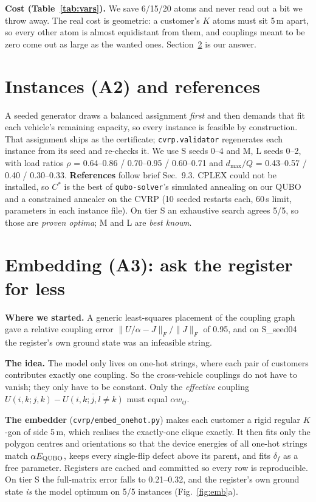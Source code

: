 \documentclass[9pt,twocolumn]{extarticle}
\newcommand{\code}[1]{\texttt{\small #1}}
\begin{document}
\textbf{Cost (Table~\ref{tab:vars}).} We save 6/15/20 atoms and never read out a bit we throw away. The real cost is geometric: a customer's $K$ atoms must sit 5\,\textmu m apart, so every other atom is almost equidistant from them, and couplings meant to be zero come out as large as the wanted ones. Section~\ref{sec:embed} is our answer.

\section{Instances (A2) and references}
A seeded generator draws a balanced assignment \emph{first} and then demands that fit each vehicle's remaining capacity, so every instance is feasible by construction. That assignment ships as the certificate; \code{cvrp.validator} regenerates each instance from its seed and re-checks it. We use S seeds 0--4 and M, L seeds 0--2, with load ratios $\rho$ = 0.64--0.86 / 0.70--0.95 / 0.60--0.71 and $d_{\max}/Q$ = 0.43--0.57 / 0.40 / 0.30--0.33. \textbf{References} follow brief Sec.~9.3. CPLEX could not be installed, so $C^*$ is the best of \code{qubo-solver}'s simulated annealing on our QUBO and a constrained annealer on the CVRP (10 seeded restarts each, 60\,s limit, parameters in each instance file). On tier S an exhaustive search agrees 5/5, so those are \emph{proven optima}; M and L are \emph{best known}.

\section{Embedding (A3): ask the register for less}\label{sec:embed}
\textbf{Where we started.} A generic least-squares placement of the coupling graph gave a relative coupling error $\|U/\alpha-J\|_F/\|J\|_F$ of 0.95, and on S\_seed04 the register's own ground state was an infeasible string.

\textbf{The idea.} The model only lives on one-hot strings, where each pair of customers contributes exactly one coupling. So the cross-vehicle couplings do not have to vanish; they only have to be constant. Only the \emph{effective} coupling $U(i,k;j,k)-\overline{U(i,k;j,l\ne k)}$ must equal $\alpha w_{ij}$.

\textbf{The embedder} (\code{cvrp/embed\_onehot.py}) makes each customer a rigid regular $K$-gon of side 5\,\textmu m, which realises the exactly-one clique exactly. It then fits only the polygon centres and orientations so that the device energies of all one-hot strings match $\alpha E_{\rm QUBO}$, keeps every single-flip defect above its parent, and fits $\delta_f$ as a free parameter. Registers are cached and committed so every row is reproducible. On tier S the full-matrix error falls to 0.21--0.32, and the register's own ground state \emph{is} the model optimum on 5/5 instances (Fig.~\ref{fig:emb}a).
\end{document}
